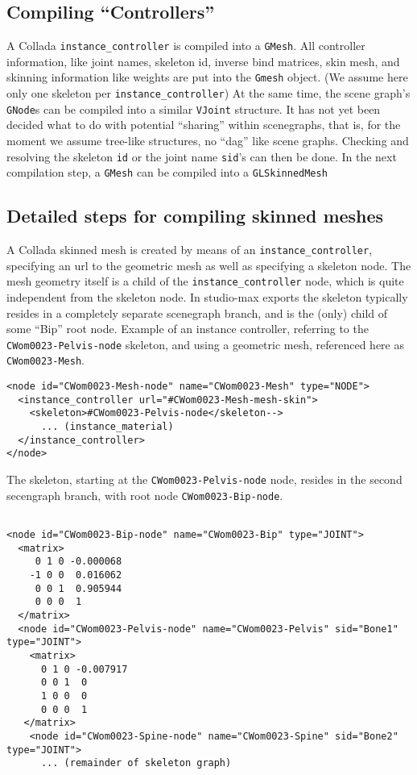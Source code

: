\begin{itemize}
\subsection{Compiling ``Controllers''}

A Collada \verb"instance_controller"  is compiled into a \verb"GMesh".
All controller information, like joint names, skeleton id, inverse bind matrices, skin mesh, and
skinning information like weights are put into the \verb"Gmesh" object. (We assume here only one skeleton per
\verb"instance_controller")
At the same time, the scene graph's \verb"GNode"s can be compiled into a similar \verb"VJoint" structure.
It has not yet been decided what to do with potential ``sharing'' within scenegraphs, that is, for the moment
we assume tree-like structures, no ``dag'' like scene graphs.
Checking and resolving the skeleton \verb"id" or the joint name \verb"sid"'s can then be done.
In the next compilation step, a \verb"GMesh" can be compiled into a \verb"GLSkinnedMesh"
\end{itemize}


\subsection{Detailed steps for compiling skinned meshes}

A Collada skinned mesh is created by means of an \verb"instance_controller", specifying an url to the geometric mesh
as well as specifying a skeleton node. The mesh geometry itself is a child of the \verb"instance_controller" node,
which is quite independent from the skeleton node. In studio-max exports the skeleton typically resides in a completely separate scenegraph branch, and is the (only) child of some ``Bip'' root node.
Example of an instance controller, referring to the \verb"CWom0023-Pelvis-node" skeleton, and
using a geometric mesh, referenced here as \verb"CWom0023-Mesh".
\begin{verbatim}
<node id="CWom0023-Mesh-node" name="CWom0023-Mesh" type="NODE">
  <instance_controller url="#CWom0023-Mesh-mesh-skin">
    <skeleton>#CWom0023-Pelvis-node</skeleton-->
      ... (instance_material)
  </instance_controller>
</node>
\end{verbatim}

The skeleton, starting at the \verb"CWom0023-Pelvis-node" node, resides in the second secengraph branch,
with root node \verb"CWom0023-Bip-node". 
\begin{verbatim}
  
<node id="CWom0023-Bip-node" name="CWom0023-Bip" type="JOINT">
  <matrix>
     0 1 0 -0.000068 
    -1 0 0  0.016062 
     0 0 1  0.905944 
     0 0 0  1
  </matrix>
  <node id="CWom0023-Pelvis-node" name="CWom0023-Pelvis" sid="Bone1" type="JOINT">
    <matrix>
      0 1 0 -0.007917 
      0 0 1  0 
      1 0 0  0 
      0 0 0  1
   </matrix>
    <node id="CWom0023-Spine-node" name="CWom0023-Spine" sid="Bone2" type="JOINT">
      ... (remainder of skeleton graph)
\end{verbatim}

